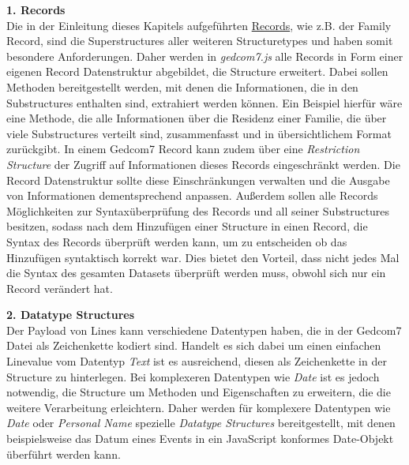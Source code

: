 \vspace{1em}
\textbf{1. Records} \vspace{0.5em} \\
Die in der Einleitung dieses Kapitels aufgeführten \hyperref[liste records]{Records}, wie z.B. der Family Record, sind die Superstructures aller weiteren Structuretypes und haben somit besondere Anforderungen. Daher werden in \textit{gedcom7.js} alle Records in Form einer eigenen Record Datenstruktur abgebildet, die Structure erweitert. Dabei sollen Methoden bereitgestellt werden, mit denen die Informationen, die in den Substructures enthalten sind, extrahiert werden können. Ein Beispiel hierfür wäre eine Methode, die alle Informationen über die Residenz einer Familie, die über viele Substructures verteilt sind, zusammenfasst und in übersichtlichem Format zurückgibt. In einem Gedcom7 Record kann zudem über eine \textit{Restriction Structure} der Zugriff auf Informationen dieses Records eingeschränkt werden. Die Record Datenstruktur sollte diese Einschränkungen verwalten und die Ausgabe von Informationen dementsprechend anpassen. Außerdem sollen alle Records Möglichkeiten zur Syntaxüberprüfung des Records und all seiner Substructures besitzen, sodass nach dem Hinzufügen einer Structure in einen Record, die Syntax des Records überprüft werden kann, um zu entscheiden ob das Hinzufügen syntaktisch korrekt war. Dies bietet den Vorteil, dass nicht jedes Mal die Syntax des gesamten Datasets überprüft werden muss, obwohl sich nur ein Record verändert hat.

\vspace{1em}
\textbf{2. Datatype Structures} \vspace{0.5em} \\
Der Payload von Lines kann verschiedene Datentypen haben, die in der Gedcom7 Datei als Zeichenkette kodiert sind. Handelt es sich dabei um einen einfachen Linevalue vom Datentyp \textit{Text} ist es ausreichend, diesen als Zeichenkette in der Structure zu hinterlegen. Bei komplexeren Datentypen wie \textit{Date} ist es jedoch notwendig, die Structure um Methoden und Eigenschaften zu erweitern, die die weitere Verarbeitung erleichtern. Daher werden für komplexere Datentypen wie \textit{Date} oder \textit{Personal Name} spezielle \textit{Datatype Structures} bereitgestellt, mit denen beispielsweise das Datum eines Events in ein JavaScript konformes Date-Objekt überführt werden kann.

